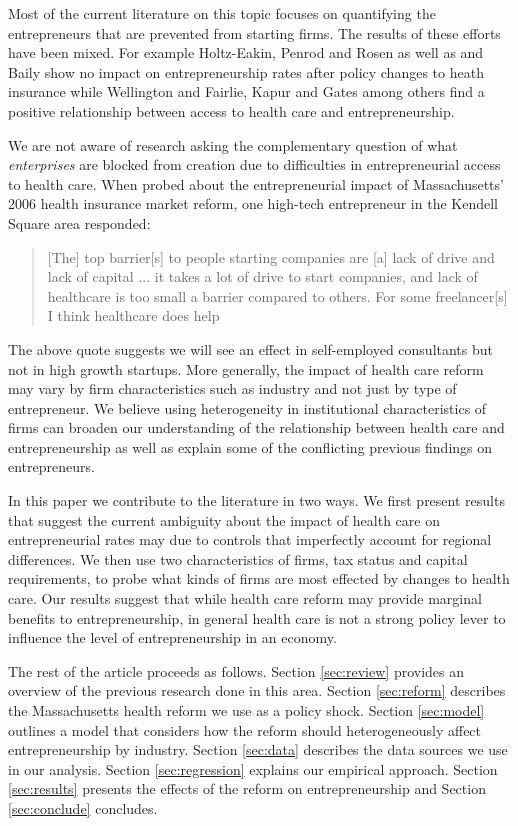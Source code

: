 \documentclass[12pt]{article}
\begin{document}
Most of the current literature on this topic focuses on quantifying the entrepreneurs
that are prevented from starting firms. The results of these efforts have been mixed. For example Holtz-Eakin, Penrod and Rosen as \cite{holtz_health} well as  and Baily \cite{bailey} show no impact on entrepreneurship rates after policy changes to heath insurance while Wellington \cite{wellington} and Fairlie, Kapur and Gates \cite{fairlie_health} among others find a positive relationship between access to health care and entrepreneurship. 


We are not aware of research asking the complementary question of what \emph{enterprises} are blocked from creation due to difficulties in entrepreneurial access to health care.  When probed about the entrepreneurial impact of Massachusetts' 2006 health insurance market reform, one high-tech entrepreneur in the Kendell Square area responded:
\begin{quote}
[The] top barrier[s] to people starting companies are [a] lack of drive and lack of capital ... it takes a lot of drive to start companies, and lack of healthcare is too small a barrier compared to others. For some freelancer[s] I think healthcare does help
\end{quote}
The above quote suggests we will see an effect in self-employed consultants but not in high growth startups. More generally, the impact of health care reform may vary by firm characteristics such as industry and not just by type of entrepreneur. We believe using heterogeneity in institutional characteristics of firms can broaden our understanding of the relationship between health care and entrepreneurship as well as explain some of the conflicting previous findings on entrepreneurs. 

In this paper we contribute to the literature in two ways. We first present results that suggest the current ambiguity about the impact of health care on entrepreneurial rates may due to controls that imperfectly account for regional differences. We then use two characteristics of firms, tax status and capital requirements, to probe what kinds of firms are most effected by changes to health care. Our results suggest that while health care reform may provide marginal benefits to entrepreneurship, in general health care is not a strong policy lever to influence the level of entrepreneurship in an economy.

The rest of the article proceeds as follows. Section \ref{sec:review} provides an overview of the previous research done in this area. Section \ref{sec:reform} describes the Massachusetts health reform we use as a policy shock. Section \ref{sec:model} outlines a model that considers how the reform should heterogeneously affect entrepreneurship by industry. Section \ref{sec:data} describes the data sources we use in our analysis. Section \ref{sec:regression} explains our empirical approach. Section \ref{sec:results} presents the effects of the reform on entrepreneurship and Section \ref{sec:conclude} concludes. 
\end{document}
